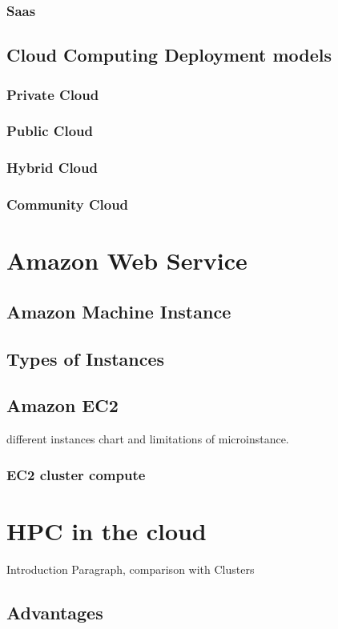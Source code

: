 \documentclass[12pt,a4paper]{report}
\begin{document}
\subsubsection{Saas}

\subsection{Cloud Computing Deployment models}
\subsubsection{Private Cloud}
\subsubsection{Public Cloud}
\subsubsection{Hybrid Cloud}
\subsubsection{Community Cloud}

\section{Amazon Web Service}
\subsection{Amazon Machine Instance}
\subsection{Types of Instances}
\subsection{Amazon EC2}
different instances chart and limitations of microinstance.
\subsubsection{EC2 cluster compute}

\section{HPC in the cloud}
Introduction Paragraph, comparison with Clusters
\subsection{Advantages}
\end{document}
